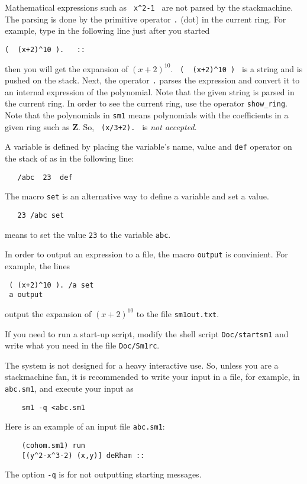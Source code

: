 Mathematical expressions such as \verb! x^2-1 ! are not parsed by the
stackmachine. 
The parsing is done by the primitive operator {\tt .} (dot) in the current
ring.
For example,  type in the following line just after you started \kansm
\begin{verbatim}
(  (x+2)^10 ).   ::
\end{verbatim}
then you will get the expansion of $ (x+2)^{10} $.
\verb! (  (x+2)^10 ) ! is a string and is pushed on the stack.
Next, the operator {\tt .} parses the expression and convert it
to an internal expression of the polynomial.
Note that the given string is parsed in the current ring.
In order to see the current ring, use the operator
{\tt show\_ring}.
Note that the polynomials in {\tt sm1} means
polynomials with the coefficients in a given ring such as {\bf Z}.
So,
\verb! (x/3+2). !
is {\em not accepted}.

A variable is defined by placing the variable's name, value and 
{\tt def} operator on the stack of \kansm as in the following
line:
\begin{verbatim}
   /abc  23  def
\end{verbatim}
The macro {\tt set} is an alternative way to define a variable and set a value.
\begin{verbatim}
   23 /abc set
\end{verbatim}
means to set the value {\tt 23} to the variable {\tt abc}.

In order to output an expression to a file,
the macro {\tt output} is convinient.
For example, the lines
\begin{verbatim}
 ( (x+2)^10 ). /a set
 a output
\end{verbatim}
output the expansion of $(x+2)^{10}$ to the file
{\tt sm1out.txt}.

If you need to run a start-up script, 
modify the shell script {\tt Doc/startsm1} and write what you need
in the file {\tt Doc/Sm1rc}.

\smallbreak
The system \kansm  is not designed for a heavy interactive use.
So, unless you are a stackmachine fan,
it is recommended to write your input in a file, for example,
in {\tt abc.sm1}, and execute your input as
{\footnotesize \begin{verbatim}
    sm1 -q <abc.sm1
\end{verbatim}}
\noindent Here is an example of an input file {\tt abc.sm1}:
{\footnotesize \begin{verbatim}
    (cohom.sm1) run
    [(y^2-x^3-2) (x,y)] deRham ::
\end{verbatim}}
\noindent The option {\tt -q} is for not outputting starting messages.


